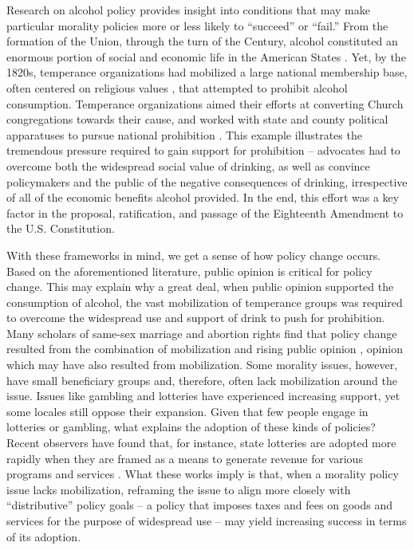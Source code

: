 Research on alcohol policy provides insight into conditions that may make particular morality policies more or less likely to ``succeed'' or ``fail.'' From the formation of the Union, through the turn of the  Century, alcohol constituted an enormous portion of social and economic life in the American States \citep{aaron_and_musto_1981}. Yet, by the 1820s, temperance organizations had mobilized a large national membership base, often centered on religious values \citep{gusfield_1963,skocpol_et_al_2000,andrews_and_seguin_2015,young_2002,beisel_1997}, that attempted to prohibit alcohol consumption. Temperance organizations aimed their efforts at converting Church congregations towards their cause, and worked with state and county political apparatuses to pursue national prohibition \citep{blocker_1989}. This example illustrates the tremendous pressure required to gain support for prohibition -- advocates had to overcome both the widespread social value of drinking, as well as convince policymakers  and the public of the negative consequences of drinking, irrespective of all of the economic benefits alcohol provided. In the end, this effort was a key factor in the proposal, ratification, and passage of the Eighteenth Amendment to the U.S. Constitution. 


With these frameworks in mind, we get a sense of how policy change occurs. Based on the aforementioned literature, public opinion is critical for policy change. This may explain why a great deal, when public opinion supported the consumption of alcohol, the vast mobilization of temperance groups was required to overcome the widespread use and support of drink to push for prohibition. Many scholars of same-sex marriage and abortion rights find that policy change resulted from the combination of mobilization and rising public opinion \citep{rohlinger_2002,zucker_1999,carmines_and_woods_2002,halfmann_2011,schnabel_and_sevell_2017}, opinion which may have also resulted from mobilization. Some morality issues, however, have small beneficiary groups and, therefore, often lack mobilization around the issue. Issues like gambling and lotteries have experienced increasing support, yet some locales still oppose their expansion. Given that few people engage in lotteries or gambling, what explains the adoption of these kinds of policies? Recent observers have found that, for instance, state lotteries are adopted more rapidly when they are framed as a means to generate revenue for various programs and services \citep{mikesell_and_zorn_1986,berry_and_berry_1990}. What these works imply is that, when a morality policy issue lacks mobilization, reframing the issue to align more closely with ``distributive'' policy goals -- a policy that imposes taxes and fees on goods and services for the purpose of widespread use \citep{lowi_1964} -- may yield increasing success in terms of its adoption.




